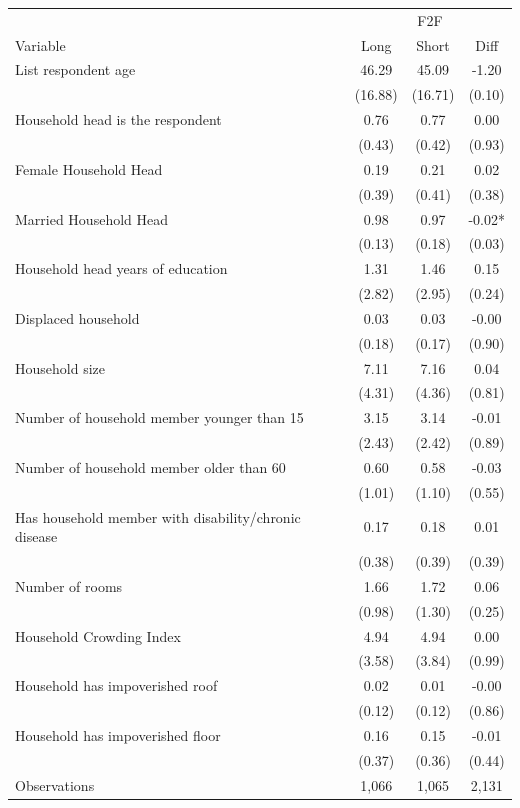 \begin{tabular}{l*{3}c}
\hline\hline
 & \multicolumn{3}{c}{F2F}\\ 
Variable & Long & Short & Diff \\
\hline
List respondent age&46.29&45.09&-1.20\\
&(16.88)&(16.71)&(0.10)\\
Household head is the respondent&0.76&0.77&0.00\\
&(0.43)&(0.42)&(0.93)\\
Female Household Head&0.19&0.21&0.02\\
&(0.39)&(0.41)&(0.38)\\
Married Household Head&0.98&0.97&-0.02*\\
&(0.13)&(0.18)&(0.03)\\
Household head years of education&1.31&1.46&0.15\\
&(2.82)&(2.95)&(0.24)\\
Displaced household&0.03&0.03&-0.00\\
&(0.18)&(0.17)&(0.90)\\
Household size&7.11&7.16&0.04\\
&(4.31)&(4.36)&(0.81)\\
Number of household member younger than 15&3.15&3.14&-0.01\\
&(2.43)&(2.42)&(0.89)\\
Number of household member older than 60&0.60&0.58&-0.03\\
&(1.01)&(1.10)&(0.55)\\
Has household member with disability/chronic disease&0.17&0.18&0.01\\
&(0.38)&(0.39)&(0.39)\\
Number of rooms&1.66&1.72&0.06\\
&(0.98)&(1.30)&(0.25)\\
Household Crowding Index&4.94&4.94&0.00\\
&(3.58)&(3.84)&(0.99)\\
Household has impoverished roof&0.02&0.01&-0.00\\
&(0.12)&(0.12)&(0.86)\\
Household has impoverished floor&0.16&0.15&-0.01\\
&(0.37)&(0.36)&(0.44)\\
\hline
Observations & 1,066 & 1,065 & 2,131 \\
\hline\hline
\end{tabular}
